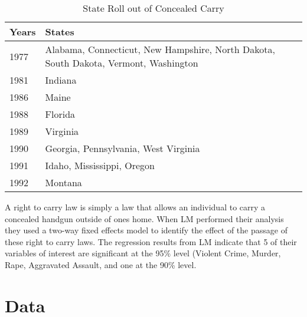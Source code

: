\documentclass{article}
\begin{document}
\begin{table}[H]
\caption{\label{tab:rollout}State Roll out of Concealed Carry}
\centering
\begin{tabular}[t]{ll}
\toprule
Years & States\\
\midrule
1977 & Alabama, Connecticut, New Hampshire, North Dakota, South Dakota, Vermont, Washington\\
1981 & Indiana\\
1986 & Maine\\
1988 & Florida\\
1989 & Virginia\\
1990 & Georgia, Pennsylvania, West Virginia\\
1991 & Idaho, Mississippi, Oregon\\
1992 & Montana\\
\bottomrule
\end{tabular}
\end{table}
A right to carry law is simply a law that allows an individual to carry a concealed handgun outside of ones home. When LM performed their analysis they used a two-way fixed effects model to identify the effect of the passage of these right to carry laws. The regression results from LM indicate that 5 of their variables of interest are significant at the 95\% level (Violent Crime, Murder, Rape, Aggravated Assault, and one at the 90\% level. 
\section*{Data}
\end{document}
